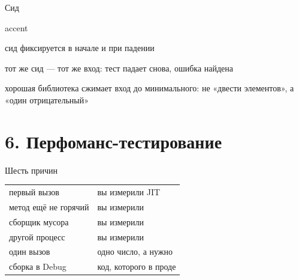 \documentclass[aspectratio=169,10pt,t]{beamer}
\begin{document}
\begin{frame}{Сид}
  \slidetop

  \begin{cbul}{accent}
    \item сид фиксируется в начале и  при падении
    \item тот же сид --- тот же вход: тест падает снова, ошибка найдена
    \item хорошая библиотека сжимает вход до минимального: не «двести элементов»,
      а «один отрицательный»
  \end{cbul}

  \slidegap
\end{frame}

\section{6. Перфоманс-тестирование}

\begin{frame}[plain]
\end{frame}

\begin{frame}[plain]
\end{frame}

\begin{frame}{Шесть причин}
  \slidetop
  {\renewcommand{\arraystretch}{1.3}
  \begin{tabular}{@{}L{4.4cm}L{8.4cm}@{}}
    первый вызов          & вы измерили  JIT \\
    метод ещё не горячий  & вы измерили  \\
    сборщик мусора        & вы измерили  \\
    другой процесс        & вы измерили  \\
    один вызов            & одно число, а нужно  \\
    сборка в Debug        & код, которого в проде  \\
  \end{tabular}}

  \slidegap
\end{frame}
\end{document}
